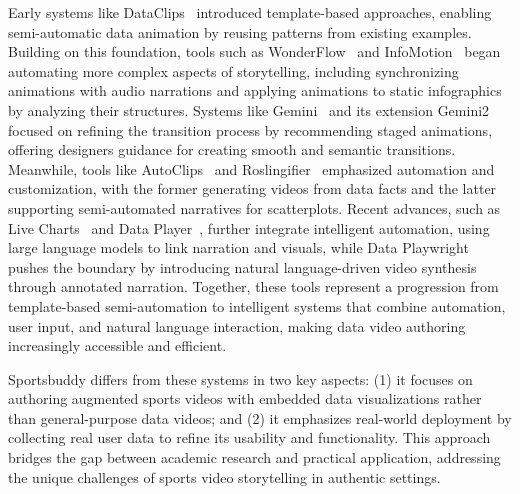 Early systems like DataClips~\cite{DBLP:journals/tvcg/AminiRLMI17} introduced template-based approaches, enabling semi-automatic data animation by reusing patterns from existing examples. Building on this foundation, tools such as WonderFlow~\cite{DBLP:journals/corr/abs-2308-04040,} and InfoMotion~\cite{DBLP:journals/cgf/WangGHCZZ21} began automating more complex aspects of storytelling, including synchronizing animations with audio narrations and applying animations to static infographics by analyzing their structures. Systems like Gemini~\cite{DBLP:journals/tvcg/KimH21} and its extension Gemini2~\cite{DBLP:conf/visualization/KimH21} focused on refining the transition process by recommending staged animations, offering designers guidance for creating smooth and semantic transitions. 
Meanwhile, tools like AutoClips~\cite{DBLP:journals/cgf/ShiSXLGC21} and Roslingifier~\cite{DBLP:journals/tvcg/ShinKHXWKKE23} emphasized automation and customization, with the former generating videos from data facts and the latter supporting semi-automated narratives for scatterplots. 
Recent advances, such as Live Charts~\cite{DBLP:journals/corr/abs-2309-02967} and Data Player~\cite{DBLP:journals/tvcg/ShenZZW24}, further integrate intelligent automation, using large language models to link narration and visuals, while Data Playwright~\cite{} pushes the boundary by introducing natural language-driven video synthesis through annotated narration. 
Together, these tools represent a progression from template-based semi-automation to intelligent systems that combine automation, user input, and natural language interaction, making data video authoring increasingly accessible and efficient.

Sportsbuddy differs from these systems in two key aspects: (1) it focuses on authoring augmented sports videos with embedded data visualizations rather than general-purpose data videos; and (2) it emphasizes real-world deployment by collecting real user data to refine its usability and functionality. This approach bridges the gap between academic research and practical application, addressing the unique challenges of sports video storytelling in authentic settings.





